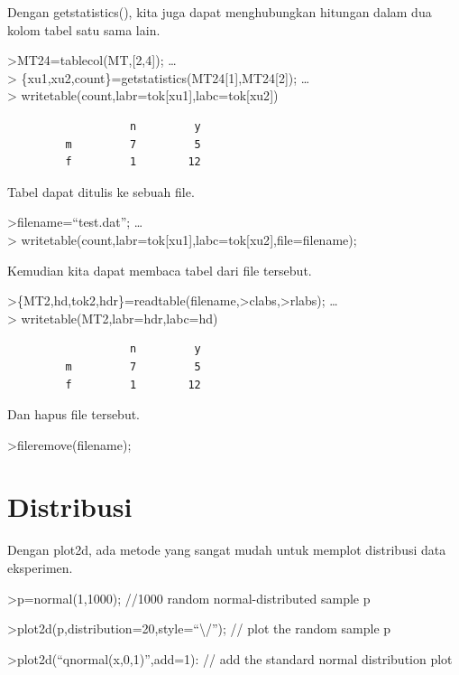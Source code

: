 \documentclass[
]{book}
\begin{document}
Dengan getstatistics(), kita juga dapat menghubungkan hitungan dalam dua kolom tabel satu sama lain.

\textgreater MT24=tablecol(MT,{[}2,4{]}); \ldots{}\\
\textgreater{} \{xu1,xu2,count\}=getstatistics(MT24{[}1{]},MT24{[}2{]}); \ldots{}\\
\textgreater{} writetable(count,labr=tok{[}xu1{]},labc=tok{[}xu2{]})

\begin{verbatim}
                   n         y
         m         7         5
         f         1        12
\end{verbatim}

Tabel dapat ditulis ke sebuah file.

\textgreater filename=``test.dat''; \ldots{}\\
\textgreater{} writetable(count,labr=tok{[}xu1{]},labc=tok{[}xu2{]},file=filename);

Kemudian kita dapat membaca tabel dari file tersebut.

\textgreater\{MT2,hd,tok2,hdr\}=readtable(filename,\textgreater clabs,\textgreater rlabs); \ldots{}\\
\textgreater{} writetable(MT2,labr=hdr,labc=hd)

\begin{verbatim}
                   n         y
         m         7         5
         f         1        12
\end{verbatim}

Dan hapus file tersebut.

\textgreater fileremove(filename);

\chapter{Distribusi}\label{distribusi}

Dengan plot2d, ada metode yang sangat mudah untuk memplot distribusi data eksperimen.

\textgreater p=normal(1,1000); //1000 random normal-distributed sample p

\textgreater plot2d(p,distribution=20,style=``\textbackslash/''); // plot the random sample p

\textgreater plot2d(``qnormal(x,0,1)'',add=1): // add the standard normal distribution plot
\end{document}
